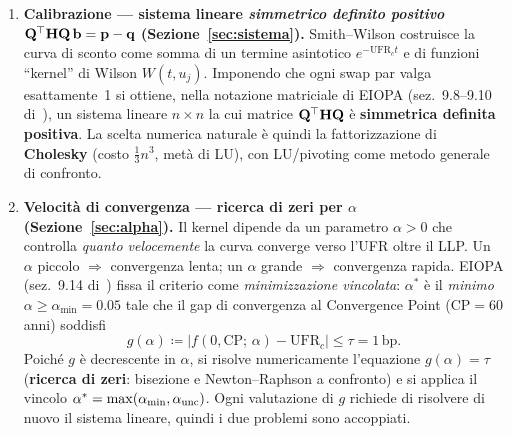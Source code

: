 \documentclass[11pt,a4paper]{article}
\theoremstyle{plain}
\theoremstyle{definition}
\theoremstyle{remark}
\newcommand{\UFR}{\mathrm{UFR}}
\newcommand{\CP}{\mathrm{CP}}
\newcommand{\bfb}{\mathbf{b}}
\newcommand{\bfp}{\mathbf{p}}
\newcommand{\bfq}{\mathbf{q}}
\newcommand{\Hmat}{\mathbf{H}}
\newcommand{\Qmat}{\mathbf{Q}}
\newcommand{\transp}{^{\mskip-1mu\top}}
\newcommand{\abs}[1]{\left\lvert #1 \right\rvert}
\newcommand{\defeq}{\coloneqq}
\begin{document}
\begin{enumerate}
  \item \textbf{Calibrazione --- sistema lineare \emph{simmetrico definito positivo}
        $\Qmat\transp\Hmat\Qmat\,\bfb = \bfp - \bfq$ (Sezione~\ref{sec:sistema}).}
        Smith--Wilson costruisce la curva di sconto come somma di un termine
        asintotico $e^{-\UFR_c t}$ e di funzioni ``kernel'' di Wilson $W(t, u_j)$.
        Imponendo che ogni swap par valga esattamente~1 si ottiene, nella notazione
        matriciale di EIOPA (sez.~9.8--9.10 di~\cite{eiopa2025}), un sistema lineare
        $n\times n$ la cui matrice $\Qmat\transp\Hmat\Qmat$ è \textbf{simmetrica
        definita positiva}. La scelta numerica naturale è quindi la fattorizzazione
        di \textbf{Cholesky} (costo $\tfrac13 n^3$, metà di LU), con LU/pivoting come
        metodo generale di confronto.

  \item \textbf{Velocità di convergenza --- ricerca di zeri per $\alpha$
        (Sezione~\ref{sec:alpha}).}
        Il kernel dipende da un parametro $\alpha > 0$ che controlla
        \emph{quanto velocemente} la curva converge verso l'UFR oltre il LLP.
        Un $\alpha$ piccolo $\Rightarrow$ convergenza lenta; un $\alpha$ grande
        $\Rightarrow$ convergenza rapida. EIOPA (sez.~9.14 di~\cite{eiopa2025})
        fissa il criterio come \emph{minimizzazione vincolata}: $\alpha^*$ è il
        \emph{minimo} $\alpha \ge \alpha_{\min}=0.05$ tale che il gap di convergenza
        al Convergence Point ($\CP = 60$ anni) soddisfi
        \[
          g(\alpha) \defeq \abs{f(0, \CP;\, \alpha) - \UFR_c} \le \tau = 1\,\text{bp}.
        \]
        Poiché $g$ è decrescente in $\alpha$, si risolve numericamente l'equazione
        $g(\alpha)=\tau$ (\textbf{ricerca di zeri}: bisezione e Newton--Raphson a
        confronto) e si applica il vincolo $\alpha^*=\max(\alpha_{\min},\alpha_{\rm unc})$.
        Ogni valutazione di $g$ richiede di risolvere di nuovo il sistema lineare,
        quindi i due problemi sono accoppiati.
\end{enumerate}
\end{document}
